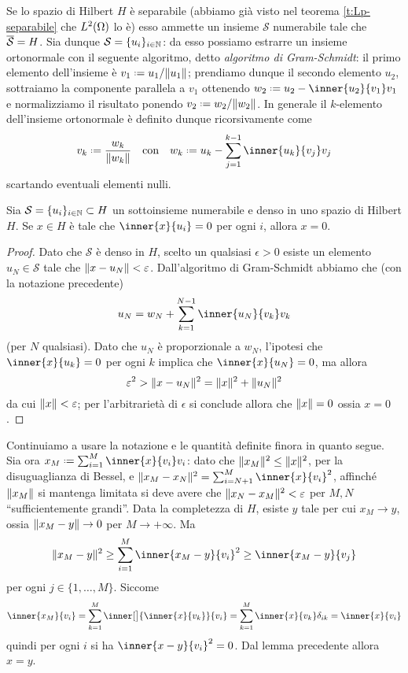Se lo spazio di Hilbert $H$ è separabile (abbiamo già visto nel teorema \ref{t:Lp-separabile} che $\leb[2]{\Omega}$ lo è) esso ammette un insieme $\mathcal{S}$ numerabile tale che $\clos{\mathcal{S}}=H$.
Sia dunque $\mathcal{S}=\{u_i\}_{i\in\N}$: da esso possiamo estrarre un insieme ortonormale con il seguente algoritmo, detto \emph{algoritmo di Gram-Schmidt}: il primo elemento dell'insieme è $v_1\defeq u_1/\norm{u_1}$; prendiamo dunque il secondo elemento $u_2$, sottraiamo la componente parallela a $v_1$ ottenendo $w_2\defeq u_2-\inner{u_2}{v_1}v_1$ e normalizziamo il risultato ponendo $v_2\defeq w_2/\norm{w_2}$.
In generale il $k$-elemento dell'insieme ortonormale è definito dunque ricorsivamente come
\begin{equation}
    v_k\defeq\frac{w_k}{\norm{w_k}}
    \qtext{con}
    w_k\defeq u_k-\sum_{j=1}^{k-1}\inner{u_k}{v_j}v_j
    \label{eq:algoritmo-gram-schmidt}
\end{equation}
scartando eventuali elementi nulli.
\begin{lemma} \label{l:completezza}
    Sia $\mathcal{S}=\{u_i\}_{i\in\N}\subset H$ un sottoinsieme numerabile e denso in uno spazio di Hilbert $H$.
    Se $x\in H$ è tale che $\inner{x}{u_i}=0$ per ogni $i$, allora $x=0$.
\end{lemma}
\begin{proof}
    Dato che $\mathcal{S}$ è denso in $H$, scelto un qualsiasi $\epsilon>0$ esiste un elemento $u_N\in\mathcal{S}$ tale che $\norm{x-u_N}<\epsilon$.
    Dall'algoritmo di Gram-Schmidt abbiamo che (con la notazione precedente)
    \begin{equation}
        u_N=w_N+\sum_{k=1}^{N-1}\inner{u_N}{v_k}v_k
    \end{equation}
    (per $N$ qualsiasi).
    Dato che $u_N$ è proporzionale a $w_N$, l'ipotesi che $\inner{x}{u_k}=0$ per ogni $k$ implica che $\inner{x}{u_N}=0$, ma allora
    \begin{equation}
        \epsilon^2>
        \norm{x-u_N}^2=
        \norm{x}^2+\norm{u_N}^2
    \end{equation}
    da cui $\norm{x}<\epsilon$; per l'arbitrarietà di $\epsilon$ si conclude allora che $\norm{x}=0$ ossia $x=0$.
\end{proof}
Continuiamo a usare la notazione e le quantità definite finora in quanto segue.
Sia ora $x_M\defeq\sum_{i=1}^M\inner{x}{v_i}v_i$: dato che $\norm{x_M}^2\le\norm{x}^2$, per la disuguaglianza di Bessel, e $\norm{x_M-x_N}^2=\sum_{i=N+1}^M\inner{x}{v_i}^2$, affinch\'e $\norm{x_M}$ si mantenga limitata si deve avere che $\norm{x_N-x_M}^2<\epsilon$ per $M,N$ ``sufficientemente grandi''.
Data la completezza di $H$, esiste $y$ tale per cui $x_M\to y$, ossia $\norm{x_M-y}\to 0$ per $M\to+\infty$.
Ma
\begin{equation}
    \norm{x_M-y}^2\ge
    \sum_{i=1}^M\inner{x_M-y}{v_i}^2\ge
    \inner{x_M-y}{v_j}
\end{equation}
per ogni $j\in\{1,\dotsc,M\}$.
Siccome
\begin{equation}
    \inner{x_M}{v_i}=
    \sum_{k=1}^M\inner[\big]{\inner{x}{v_k}}{v_i}=
    \sum_{k=1}^M\inner{x}{v_k}\delta_{ik}=
    \inner{x}{v_i}
\end{equation}
quindi per ogni $i$ si ha $\inner{x-y}{v_i}^2=0$.
Dal lemma precedente allora $x=y$.

